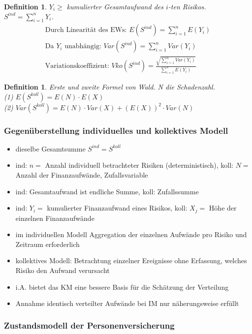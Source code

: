 \documentclass[12pt]{report}
\theoremstyle{dotless}
\newtheorem{defn}[thm]{Definition}
\theoremstyle{definition}
\begin{document}
\begin{defn}
$Y_i\geq$ kumulierter Gesamtaufwand des $i$-ten Risikos. $S^{ind}=\sum_{i=1}^nY_i $.
	\begin{align}
		\text{Durch Linearität des EWs: } E(S^{ind})=\sum_{i=1}^n E(Y_i) \\
		\text{Da } Y_i \text{ unabhängig: } Var(S^{ind})=\sum_{i=1}^n Var(Y_i) \\
		\text{Variationskoeffizient: } Vko(S^{ind})=\frac{\sqrt{\sum_{i=1}^nVar(Y_i)}}{\sum_{i=1}^nE(Y_i)}
	\end{align}
\end{defn}

\begin{defn}
	Erste und zweite Formel von Wald. N die Schadenzahl. \\
	(1) $E(S^{koll})=E(N)\cdot E(X)$ \\
	(2) $Var(S^{koll})=E(N) \cdot Var(X) + (E(X))^2 \cdot Var(N)$
\end{defn}

\subsubsection{Gegenüberstellung individuelles und kollektives Modell}
\begin{itemize}
	\item dieselbe Gesamtsumme $S^{ind}=S^{koll}$
	\item ind: $n =$ Anzahl individuell betrachteter Risiken (deterministisch), koll: $N =$ Anzahl der Finanzaufwände, Zufallsvariable
	\item ind: Gesamtaufwand ist endliche Summe, koll: Zufallssumme
	\item ind: $Y_i =$ kumulierter Finanzaufwand eines Risikos, koll: $X_j =$ Höhe der einzelnen Finanzaufwände
	\item im individuellen Modell Aggregation der einzelnen Aufwände pro Risiko und Zeitraum erforderlich
	\item kollektives Modell: Betrachtung einzelner Ereignisse ohne Erfassung, welches Risiko den Aufwand verursacht
	\item i.A. bietet das KM eine bessere Basis für die Schätzung der Verteilung
	\item Annahme identisch verteilter Aufwände bei IM nur näherungsweise erfüllt 
\end{itemize}


\subsubsection{Zustandsmodell der Personenversicherung}
\end{document}
